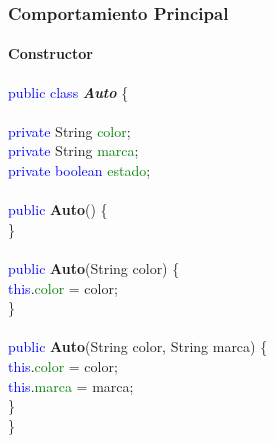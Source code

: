 \documentclass{beamer}
\begin{document}
        \begin{frame}
			\frametitle{Comportamiento Principal}
			\framesubtitle{Constructor}

			\begin{block}{}
				{\scriptsize
				\textcolor{blue}{public class} \textbf{\emph{Auto}} \{ \\
				\hspace{1cm} \\
				\hspace{1cm} \textcolor{blue}{private} String \textcolor{green}{color}; \ \\
				\hspace{1cm} \textcolor{blue}{private} String \textcolor{green}{marca}; \ \\
				\hspace{1cm} \textcolor{blue}{private} \textcolor{blue}{boolean} \textcolor{green}{estado}; \ \\
				\hspace{1cm} \\
				\hspace{1cm} \textcolor{blue}{public} \textbf{Auto}() \{ \\
				\hspace{1cm} \} \\
				\hspace{1cm} \\
				\hspace{1cm} \textcolor{blue}{public} \textbf{Auto}(String color) \{ \\
				\hspace{2cm} \textcolor{blue}{this}.\textcolor{green}{color} = color; \\
				\hspace{1cm} \} \\
				\hspace{1cm} \\
				\hspace{1cm} \textcolor{blue}{public} \textbf{Auto}(String color, String marca) \{ \\
				\hspace{2cm} \textcolor{blue}{this}.\textcolor{green}{color} = color; \\
				\hspace{2cm} \textcolor{blue}{this}.\textcolor{green}{marca} = marca; \\
				\hspace{1cm} \} \\
				\}}
			\end{block}
		\end{frame}
\end{document}
